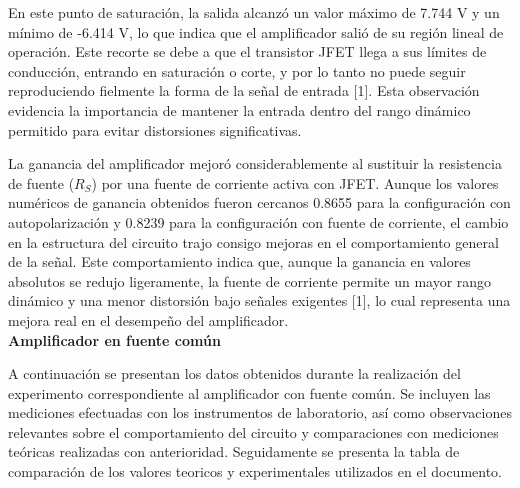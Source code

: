 \documentclass[journal]{IEEEtran}
\begin{document}
\par En este punto de saturación, la salida alcanzó un valor máximo de 7.744 V y un mínimo de -6.414 V, lo que indica que el amplificador salió de su región lineal de operación. Este recorte se debe a que el transistor JFET llega a sus límites de conducción, entrando en saturación o corte, y por lo tanto no puede seguir reproduciendo fielmente la forma de la señal de entrada [1]. Esta observación evidencia la importancia de mantener la entrada dentro del rango dinámico permitido para evitar distorsiones significativas.
\par La ganancia del amplificador mejoró considerablemente al sustituir la resistencia de fuente (\( R_S \)) por una fuente de corriente activa con JFET. Aunque los valores numéricos de ganancia obtenidos fueron cercanos 0.8655 para la configuración con autopolarización y 0.8239 para la configuración con fuente de corriente, el cambio en la estructura del circuito trajo consigo mejoras en el comportamiento general de la señal. Este comportamiento indica que, aunque la ganancia en valores absolutos se redujo ligeramente, la fuente de corriente permite un mayor rango dinámico y una menor distorsión bajo señales exigentes [1], lo cual representa una mejora real en el desempeño del amplificador.
\newline
\\
\textbf{Amplificador en fuente común}
\par A continuación se presentan los datos obtenidos durante la realización del experimento correspondiente al amplificador con fuente común. Se incluyen las mediciones efectuadas con los instrumentos de laboratorio, así como observaciones relevantes sobre el comportamiento del circuito y comparaciones con mediciones teóricas realizadas con anterioridad. Seguidamente se presenta la tabla de comparación de los valores teoricos y experimentales utilizados en el documento.
\end{document}

